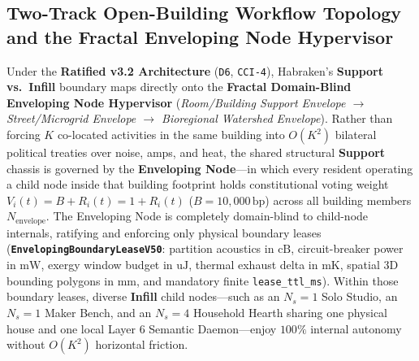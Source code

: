 \subsection{Two-Track Open-Building Workflow Topology and the Fractal Enveloping Node Hypervisor}

Under the \textbf{Ratified v3.2 Architecture} (\texttt{D6}, \texttt{CCI-4}), Habraken's \textbf{Support vs.\ Infill} boundary maps directly onto the
\textbf{Fractal Domain-Blind Enveloping Node Hypervisor} (\textit{Room/Building Support Envelope $\to$ Street/Microgrid Envelope $\to$ Bioregional
Watershed Envelope}). Rather than forcing $K$ co-located activities in the same building into $O(K^2)$ bilateral political treaties over noise, amps,
and heat, the shared structural \textbf{Support} chassis is governed by the \textbf{Enveloping Node}---in which every resident operating a child node inside
that building footprint holds constitutional voting weight $V_i(t) = B + R_i(t) = 1 + R_i(t)$ ($B = 10{,}000\,\mathrm{bp}$) across all building
members $N_{\mathrm{envelope}}$. The Enveloping Node is completely domain-blind to child-node internals, ratifying and enforcing only physical boundary
leases (\textbf{\texttt{EnvelopingBoundaryLeaseV50}}: partition acoustics in $\mathrm{cB}$, circuit-breaker power in $\mathrm{mW}$, exergy window budget
in $\mathrm{uJ}$, thermal exhaust delta in $\mathrm{mK}$, spatial 3D bounding polygons in $\mathrm{mm}$, and mandatory finite \texttt{lease\_ttl\_ms}).
Within those boundary leases, diverse \textbf{Infill} child nodes---such as an $N_s = 1$ Solo Studio, an $N_s = 1$ Maker Bench, and an $N_s = 4$ Household
Hearth sharing one physical house and one local Layer 6 Semantic Daemon---enjoy $100\%$ internal autonomy without $O(K^2)$ horizontal friction.

